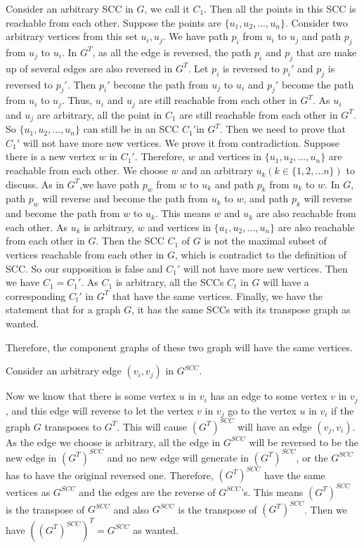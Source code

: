 \documentclass[12pt]{article}
\begin{document}
Consider an arbitrary SCC in $G$, we call it $C_1$. Then all the points in this SCC is reachable from each other. Suppose the points are $\{u_1, u_2, ...,u_n\}$. Consider two arbitrary vertices from this set $u_i, u_j$. We have path $p_i$ from $u_i $ to $u_j$ and path $p_j$ from $u_j $ to $u_i$. In $G^{T}$, as all the edge is reversed, the path $p_i$ and $p_j$ that are make up of several edges are also reversed in $G^{T}$. Let $p_i$ is reversed to $p_{i}'$ and $p_j$ is reversed to $p_{j}'$. Then $p_{i}'$ become the path from $u_j $ to $u_i$ and $p_{j}'$ become the path from $u_i $ to $u_j$. Thus, $u_i$ and $u_j$ are still reachable from each other in $G^{T}$. As $u_i$ and $u_j$ are arbitrary, all the point in $C_1$ are still reachable from each other in $G^{T}$. So $\{u_1, u_2, ...,u_n\}$ can still be in an SCC $C_{1}'$in $G^{T}$. Then we need to prove that $C_{1}'$ will not have more new vertices. We prove it from contradiction. Suppose there is a new vertex $w$ in $C_{1}'$. Therefore, $w$ and vertices in $\{u_1, u_2, ...,u_n\}$ are reachable from each other. We choose $w$ and an arbitrary $u_k(k\in\{1,2,...n\})$ to discuss. As in $G^{T}$,we have path $p_w$ from $w$ to $u_k$ and path $p_k$ from $u_k$ to $w$. In $G$, path $p_w$ will reverse and become the path from $u_k$ to $w$, and path $p_k$ will reverse and become the path from $w$ to $u_k$. This means $w$ and $u_k$ are also reachable from each other. As $u_k$ is arbitrary, $w$ and vertices in $\{u_1, u_2, ...,u_n\}$ are also reachable from each other in $G$. Then the SCC $C_1$ of $G$ is not the maximal subset of vertices reachable from each other in $G$, which is contradict to the definition of SCC. So our supposition is false and $C_{1}'$ will not have more new vertices. Then we have $C_1 = C_{1}'$. As $C_1$ is arbitrary, all the SCCs $C_t$ in $G$ will have a corresponding $C_{t}'$ in $G^{T}$ that have the same vertices. Finally, we have the statement that for a graph $G$, it has the same SCCs with its transpose graph as wanted.

Therefore, the component graphs of these two graph will have the same vertices. 

Consider an arbitrary edge $(v_{i}, v_{j})$ in $G^{SCC}$. 

Now we know that there is some vertex $u$ in $v_i$ has an edge to some vertex $v$ in $v_j$, and this edge will reverse to let the vertex $v$ in $v_j$ go to the vertex $u$ in $v_i$ if the graph $G$ transposes to $G^{T}$. This will cause $(G^{T})^{SCC}$ will have an edge $(v_{j}, v_{i})$. As the edge we choose is arbitrary, all the edge in $G^{SCC}$ will be reversed to be the new edge in $(G^{T})^{SCC}$ and no new edge will generate in $(G^{T})^{SCC}$, or the $G^{SCC}$ has to have the original reversed one. Therefore, $(G^{T})^{SCC}$ have the same vertices as $G^{SCC}$ and the edges are the reverse of $G^{SCC}$’s. This means $(G^{T})^{SCC}$ is the transpose of $G^{SCC}$ and also $G^{SCC}$ is the transpose of $(G^{T})^{SCC}$. Then we have $((G^{T})^{SCC})^T = G^{SCC}$ as wanted.
\end{document}
